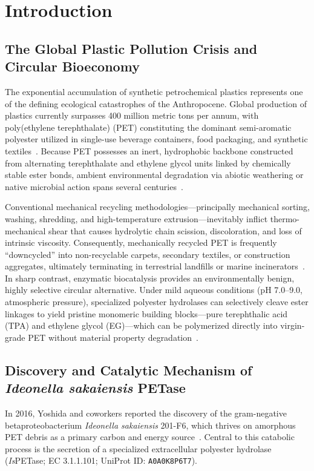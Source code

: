 \documentclass[10pt,twocolumn,a4paper]{article}
\begin{document}
\section{Introduction}

\subsection{The Global Plastic Pollution Crisis and Circular Bioeconomy}
The exponential accumulation of synthetic petrochemical plastics represents one of the defining ecological catastrophes of the Anthropocene. Global production of plastics currently surpasses 400 million metric tons per annum, with poly(ethylene terephthalate) (PET) constituting the dominant semi-aromatic polyester utilized in single-use beverage containers, food packaging, and synthetic textiles~\cite{Geyer2017}. Because PET possesses an inert, hydrophobic backbone constructed from alternating terephthalate and ethylene glycol units linked by chemically stable ester bonds, ambient environmental degradation via abiotic weathering or native microbial action spans several centuries~\cite{Jambeck2015}.

Conventional mechanical recycling methodologies—principally mechanical sorting, washing, shredding, and high-temperature extrusion—inevitably inflict thermo-mechanical shear that causes hydrolytic chain scission, discoloration, and loss of intrinsic viscosity. Consequently, mechanically recycled PET is frequently ``downcycled'' into non-recyclable carpets, secondary textiles, or construction aggregates, ultimately terminating in terrestrial landfills or marine incinerators~\cite{Rahimi2017}. In sharp contrast, enzymatic biocatalysis provides an environmentally benign, highly selective circular alternative. Under mild aqueous conditions (pH 7.0–9.0, atmospheric pressure), specialized polyester hydrolases can selectively cleave ester linkages to yield pristine monomeric building blocks—pure terephthalic acid (TPA) and ethylene glycol (EG)—which can be polymerized directly into virgin-grade PET without material property degradation~\cite{Tournier2020,Wei2017}.

\subsection{Discovery and Catalytic Mechanism of \textit{Ideonella sakaiensis} PETase}
In 2016, Yoshida and coworkers reported the discovery of the gram-negative betaproteobacterium \textit{Ideonella sakaiensis} 201-F6, which thrives on amorphous PET debris as a primary carbon and energy source~\cite{Yoshida2016}. Central to this catabolic process is the secretion of a specialized extracellular polyester hydrolase (\textit{Is}PETase; EC 3.1.1.101; UniProt ID: \texttt{A0A0K8P6T7}). 
\end{document}
